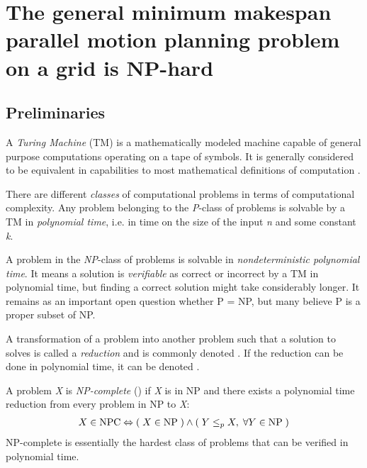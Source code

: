 \section{The general minimum makespan parallel motion planning problem on a grid is NP-hard}

\cite{siamcomp/DemaineFKMS19} \cite{corr/YuL15c}

\subsection{Preliminaries}

A \emph{Turing Machine} (TM) is a mathematically modeled machine capable of general purpose computations operating on a tape of symbols. It is generally considered to be equivalent in capabilities to most mathematical definitions of computation \cite{aw/HopcroftU79}.

There are different \emph{classes} of computational problems in terms of computational complexity. Any problem belonging to the \emph{P}-class of problems is solvable by a TM in \emph{polynomial time}, i.e. in  time on the size of the input \emph{n} and some constant \emph{k}.

A problem in the \emph{NP}-class of problems is solvable in \emph{nondeterministic polynomial time}. It means a solution is \emph{verifiable} as correct or incorrect by a TM in polynomial time, but finding a correct solution might take considerably longer. It remains as an important open question whether P = NP, but many believe P is a proper subset of NP.

A transformation of a problem  into another problem  such that a solution to  solves  is called a \emph{reduction} and is commonly denoted . If the reduction can be done in polynomial time, it can be denoted .

\begin{definition}\label{def:np_complete}
	A problem \emph{X} is \emph{NP-complete} () if \emph{X} is in NP and there exists a polynomial time reduction from every problem in NP to \emph{X}:
	\begin{align}
		X \in \text{NPC} \Leftrightarrow (\; X \in \text{NP} \;) \land (\; Y \leq_p X, \; \forall Y \in \text{NP} \;)
	\end{align}
	NP-complete is essentially the hardest class of problems that can be verified in polynomial time. 
\end{definition}

